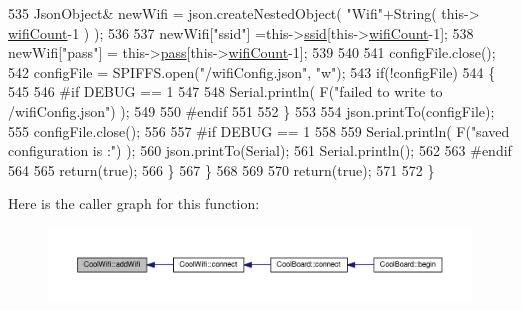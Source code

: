 \begin{DoxyCode}
535             JsonObject& newWifi = json.createNestedObject( \textcolor{stringliteral}{"Wifi"}+String( this->
      \hyperlink{classCoolWifi_ab133bd92fcb895b884deecd6678592e4}{wifiCount}-1 ) );
536             
537             newWifi[\textcolor{stringliteral}{"ssid"}] =this->\hyperlink{classCoolWifi_a893b21d0fed821438733bba2e73fb4c2}{ssid}[this->\hyperlink{classCoolWifi_ab133bd92fcb895b884deecd6678592e4}{wifiCount}-1];
538             newWifi[\textcolor{stringliteral}{"pass"}] = this->\hyperlink{classCoolWifi_a0c3332a149245aaad060b32593a54c9b}{pass}[this->\hyperlink{classCoolWifi_ab133bd92fcb895b884deecd6678592e4}{wifiCount}-1];
539             
540 
541             configFile.close();
542             configFile = SPIFFS.open(\textcolor{stringliteral}{"/wifiConfig.json"}, \textcolor{stringliteral}{"w"});
543             \textcolor{keywordflow}{if}(!configFile)
544             \{
545             
546 \textcolor{preprocessor}{            #if DEBUG == 1 }
547 
548                 Serial.println( F(\textcolor{stringliteral}{"failed to write to /wifiConfig.json"}) );
549             
550 \textcolor{preprocessor}{            #endif}
551 
552             \}
553             
554             json.printTo(configFile);
555             configFile.close();
556 
557 \textcolor{preprocessor}{        #if DEBUG == 1 }
558 
559             Serial.println( F(\textcolor{stringliteral}{"saved configuration is :"}) );
560             json.printTo(Serial);
561             Serial.println();
562         
563 \textcolor{preprocessor}{        #endif}
564 
565             \textcolor{keywordflow}{return}(\textcolor{keyword}{true}); 
566         \}
567     \}   
568 
569     
570     \textcolor{keywordflow}{return}(\textcolor{keyword}{true});
571     
572 \}
\end{DoxyCode}
Here is the caller graph for this function\+:\nopagebreak
\begin{figure}[H]
\begin{center}
\leavevmode
\includegraphics[width=350pt]{classCoolWifi_a914d7a1df14dd6b75345fb614c34e9d6_icgraph}
\end{center}
\end{figure}
\mbox{\label{classCoolWifi_a46942fed90e475112cc10b78a32e7aaa}} 
